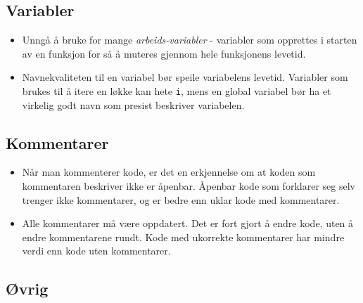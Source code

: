 \subsection{Variabler}

\begin{itemize}
    \item Unngå å bruke for mange \textit{arbeids-variabler} - variabler som opprettes i starten av en funksjon for så å muteres gjennom hele funksjonens levetid.
    \item Navnekvaliteten til en variabel bør speile variabelens levetid. Variabler som brukes til å itere en løkke kan hete \verb|i|, mens en global variabel bør ha et virkelig godt navn som presist beskriver variabelen.
\end{itemize}

\subsection{Kommentarer}

\begin{itemize}
    \item Når man kommenterer kode, er det en erkjennelse om at koden som kommentaren beskriver ikke er åpenbar. Åpenbar kode som forklarer seg selv trenger ikke kommentarer, og er bedre enn uklar kode med kommentarer.
    \item Alle kommentarer må være oppdatert. Det er fort gjort å endre kode, uten å endre kommentarene rundt. Kode med ukorrekte kommentarer har mindre verdi enn kode uten kommentarer.
\end{itemize}

\subsection{Øvrig}


